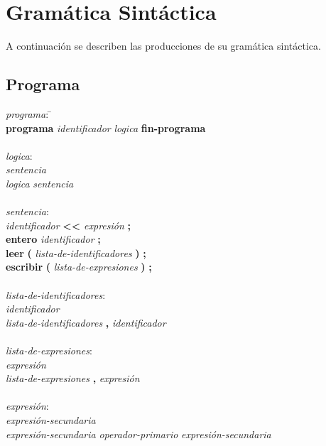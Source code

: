 
\section{Gramática Sintáctica}

A continuación se describen las producciones de su gramática sintáctica.

\subsection{Programa}

\begin{tabbing}

\textit{programa}: \= \+ \\
    \textbf{programa} \textit{identificador}
    \textit{logica}
    \textbf{fin-programa} \\

\- \\ \textit{logica}: \+ \\
    \textit{sentencia} \\
    \textit{logica} \textit{sentencia} \\

\- \\ \textit{sentencia}: \+ \\
    \textit{identificador} \textbf{<}\textbf{<} \textit{expresión} \textbf{;}\\
    \textbf{entero} \textit{identificador} \textbf{;}\\
    \textbf{leer} \textbf{(} \textit{lista-de-identificadores} \textbf{)} \textbf{;}\\
    \textbf{escribir} \textbf{(} \textit{lista-de-expresiones} \textbf{)} \textbf{;}\\

\- \\ \textit{lista-de-identificadores}: \+ \\
    \textit{identificador} \\
    \textit{lista-de-identificadores} \textbf{,} \textit{identificador} \\

\- \\ \textit{lista-de-expresiones}: \+ \\
    \textit{expresión} \\
    \textit{lista-de-expresiones} \textbf{,} \textit{expresión} \\

\- \\ \textit{expresión}: \+ \\
    \textit{expresión-secundaria} \\
    \textit{expresión-secundaria} \textit{operador-primario} \textit{expresión-secundaria}\\


\end{tabbing}
